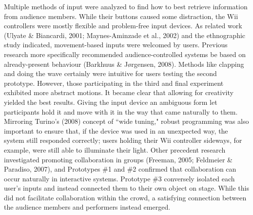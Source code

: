 Multiple methods of input were analyzed to find how to best retrieve information from audience members. While their buttons caused some distraction, the Wii controllers were mostly flexible and problem-free input devices. As related work (Ulyate \& Biancardi, 2001; Maynes-Aminzade et al., 2002) and the ethnographic study indicated, movement-based inputs were welcomed by users. Previous research more specifically recommended audience-controlled systems be based on already-present behaviour (Barkhuus \& J{\o}rgensen, 2008). Methods like clapping and doing the wave certainly were intuitive for users testing the second prototype. However, those participating in the third and final experiment exhibited more abstract motions. It became clear that allowing for creativity yielded the best results. Giving the input device an ambiguous form let participants hold it and move with it in the way that came naturally to them. Mirroring Turino's (2008) concept of ``wide tuning," robust programming was also important to ensure that, if the device was used in an unexpected way, the system still responded correctly; users holding their Wii controller sideways, for example, were still able to illuminate their light. Other precedent research investigated promoting collaboration in groups (Freeman, 2005; Feldmeier \& Paradiso, 2007), and Prototypes \#1 and \#2 confirmed that collaboration can occur naturally in interactive systems. Prototype \#3 conversely isolated each user's inputs and instead connected them to their own object on stage. While this did not facilitate collaboration within the crowd, a satisfying connection between the audience members and performers instead emerged.
